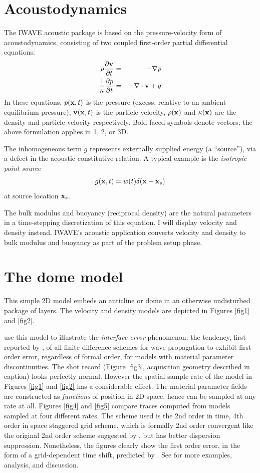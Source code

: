 \documentclass [12pt]{georeport}
\newcommand{\bx}{{\bf x}}
\newcommand{\bv}{{\bf v}}
\begin{document}
\section{Acoustodynamics}
The IWAVE acoustic package is based on the pressure-velocity form of acoustodynamics, consisting of two coupled first-order partial differential equations:
\begin{eqnarray}
\label{awe}
\rho \frac{\partial \bv}{\partial t} &=& - \nabla p \\
\frac{1}{\kappa}\frac{\partial p}{\partial t} &=& -\nabla \cdot \bv + g
\end{eqnarray}
In these equations, $p(\bx,t)$ is the pressure (excess, relative to an ambient equilibrium pressure), $\bv(\bx,t)$ is the particle velocity, $\rho(\bx)$ and $\kappa(\bx)$ are the density and particle velocity respectively. Bold-faced symbols denote vectors; the above formulation applies in 1, 2, or 3D. 

The inhomogeneous term $g$ represents externally supplied energy (a
``source''), via a defect in the acoustic constitutive relation. A
typical example is the {\em isotropic point source}
\[
g(\bx,t) = w(t) \delta(\bx-\bx_s)
\]
at source location $\bx_s$.

The bulk modulus and buoyancy (reciprocal density) are the natural parameters in a time-stepping discretization of this equation. I will display velocity and density instead. IWAVE's acoustic application converts velocity and density to bulk modulus and buoyancy as part of the problem setup phase.

\section{The dome model}

This simple 2D model embeds an anticline or dome in an otherwise
undisturbed package of layers. The velocity and density models are
depicted in Figures \ref{fig1} and \ref{fig2}.

\cite[]{SymesVdovina:09} use this model to illustrate the {\em
  interface error} phenomenon: the tendency, first reported by
\cite[]{Brown:84}, of all finite difference schemes for wave
propagation to exhibit first order error, regardless of formal order,
for models with material parameter discontinuities. The shot record
(Figure \ref{fig3}, acquisition geometry described in caption) looks
perfectly normal. However the spatial sample rate of the model in
Figures \ref{fig1} and \ref{fig2} has a considerable effect. The
material parameter fields are constructed as {\em functions} of
position in 2D space, hence can be sampled at any rate at all. Figures
\ref{fig4} and \ref{fig5} compare traces computed from models sampled
at four different rates. The scheme used is the 2nd order in time,
4th order in space staggered grid scheme, which is formally 2nd order
convergent like the original 2nd order scheme suggested by
\cite[]{Vir:84}, but has better dispersion suppression. Nonetheless,
the figures clearly show the first order error, in the form of a
grid-dependent time shift, predicted by \cite[]{Brown:84}. See
\cite{SymesVdovina:09} for more examples, analysis, and discussion.
\end{document}
